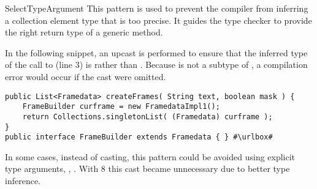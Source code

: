 \begin{pattern}{SelectTypeArgument}
This pattern is used to prevent the compiler
from inferring a collection element type that is too precise.
It guides the type checker to provide the right return type of a generic method.


\instances{}
In the following snippet, an upcast is performed to ensure that the
inferred type of the call to  (line 3)
is  rather than .
Because  is not a subtype of ,
a compilation error would occur if the cast were omitted.

\def\urlvar{http://bit.ly/arpruss_raspberryjammod_2USL7Ai}
\begin{verbatim}
public List<Framedata> createFrames( String text, boolean mask ) {
    FrameBuilder curframe = new FramedataImpl1();
    return Collections.singletonList( (Framedata) curframe );
}
public interface FrameBuilder extends Framedata { } #\urlbox#
\end{verbatim}


\issues{}
In some cases, instead of casting, this pattern could be avoided using explicit type arguments,
\eg{}, .
With \java{} 8 this cast became unnecessary due to better type inference.%
\end{pattern}
